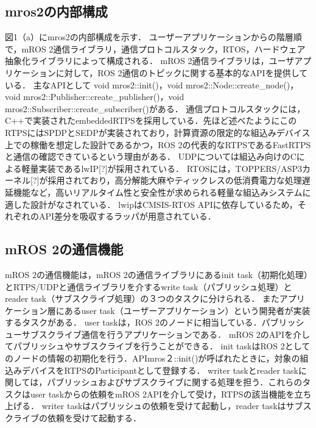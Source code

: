 \subsection{mros2の内部構成}
図1（a）にmros2の内部構成を示す．
ユーザーアプリケーションからの階層順で，mROS 2通信ライブラリ，通信プロトコルスタック，RTOS，ハードウェア抽象化ライブラリによって構成される．
mROS 2通信ライブラリは，ユーザアプリケーションに対して，ROS 2通信のトピックに関する基本的なAPIを提供している．
主なAPIとして void mros2::init()，void mros2::Node::create\_node()，void mros2::Publisher::create\_publisher()，void mros2::Subscriber::create\_subscriber()がある．
通信プロトコルスタックには，C++で実装されたembeddedRTPSを採用している．先ほど述べたようにこのRTPSにはSPDPとSEDPが実装されており，計算資源の限定的な組込みデバイス上での稼働を想定した設計であるかつ，ROS 2の代表的なRTPSであるFastRTPSと通信の確認できているという理由がある．
UDPについては組込み向けのCによる軽量実装であるlwIP[?]が採用されている．
RTOSには，TOPPERS/ASP3カーネル[?]が採用されており，高分解能大麻やティックレスの低消費電力な処理遅延機能など，高いリアルタイム性と安全性が求められる軽量な組込みシステムに適した設計がなされている．
lwipはCMSIS-RTOS APIに依存しているため，それぞれのAPI差分を吸収するラッパが用意されている．
\subsection{mROS 2の通信機能}
mROS 2の通信機能は，mROS 2の通信ライブラリにあるinit task（初期化処理）とRTPS/UDPと通信ライブラリを介するwrite task（パブリッシュ処理）とreader task（サブスクライブ処理）の３つのタスクに分けられる．
またアプリケーション層にあるuser task（ユーザーアプリケーション）という開発者が実装するタスクがある．
user taskは，ROS 2のノードに相当している．パブリッシューサブスクライブ通信を行うアプリケーションである．
mROS 2のAPIを介してパブリッシュやサブスクライブを行うことができる．
init taskはROS 2としてのノードの情報の初期化を行う．APImros２::init()が呼ばれたときに，対象の組込みデバイスをRTPSのParticipantとして登録する．
writer taskとreader taskに関しては，パブリッシュおよびサブスクライブに関する処理を担う．これらのタスクはuser taskからの依頼をmROS 2APIを介して受け，RTPSの該当機能を立ち上げる．
writer taskはパブリッシュの依頼を受けて起動し，reader taskはサブスクライブの依頼を受けて起動する．
